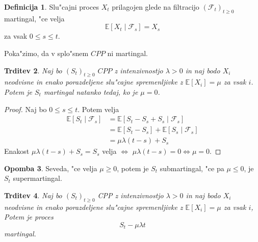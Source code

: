 \documentclass[12pt, a4paper, reqno]{amsart}
\theoremstyle{definition} %
\newtheorem{definicija}{Definicija}[section]
\newtheorem{opomba}[definicija]{Opomba}
\theoremstyle{plain} %
\newtheorem{trditev}[definicija]{Trditev}
\newcommand{\E}{\mathbb{E}}
\newcommand{\F}{\mathcal{F}}
\newcommand{\1}{\mathds{1}}
\begin{document}
        \begin{definicija}
            Slu"cajni proces $X_t$ prilagojen glede na filtracijo $(\F_t)_{t\geq0}$
            martingal, "ce velja 
            $$
                \E\left[X_t\mid\F_s\right] = X_s
            $$
            za vsak $0\leq s \leq t$.
            \label{def:martingal}
        \end{definicija}

        Poka"zimo, da v splo"snem $CPP$ ni martingal.

        \begin{trditev}
            Naj bo $(S_t)_{t\geq0}$ $CPP$ z intenzivnostjo $\lambda>0$ in naj bodo $X_i$ neodvisne
            in enako porazdeljene slu"cajne spremenljivke z $\E\left[X_i\right] = \mu$ za vsak $i$.
            Potem je $S_t$ martingal natanko tedaj, ko je $\mu = 0$.
            \label{trd:CPPnimartingal}
        \end{trditev}

        \begin{proof}
            Naj bo $0\leq s\leq t$. Potem velja
            \begin{align*}
                \E\left[S_t\mid\F_s\right] 
                        &= \E\left[S_t - S_s + S_s\mid \F_s\right] \\
                        &= \E\left[S_t - S_s\right] + \E\left[S_s\mid \F_s\right] \\
                        &= \mu\lambda(t-s) + S_s
            \end{align*}
           Enakost $\mu\lambda(t-s) + S_s = S_s$ velja $\iff$ $\mu\lambda(t-s) = 0 \iff \mu = 0$.
        \end{proof}

        \begin{opomba}
            Seveda, "ce velja $\mu \geq 0$, potem je $S_t$ submartingal, "ce pa $\mu \leq 0$, je
            $S_t$ supermartingal.
        \end{opomba}

        \begin{trditev}
            Naj bo $(S_t)_{t\geq0}$ CPP z intenzivnostjo $\lambda > 0$ in naj bodo $X_i$ neodvisne
            in enako porazdeljene slu"cajne spremenljivke z $\E\left[X_i\right] = \mu$ za vsak $i$,
            Potem je proces 
            $$
                S_t - \mu\lambda t
            $$
            martingal.
            \label{trd:CPPpostanemartingal}
        \end{trditev}
\end{document}
